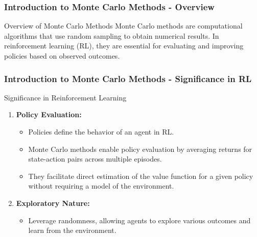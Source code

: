 \documentclass[aspectratio=169]{beamer}
\begin{document}
\frame{\titlepage}

\begin{frame}[fragile]
    \frametitle{Introduction to Monte Carlo Methods - Overview}
    \begin{block}{Overview of Monte Carlo Methods}
        Monte Carlo methods are computational algorithms that use random sampling to obtain numerical results. 
        In reinforcement learning (RL), they are essential for evaluating and improving policies based on observed outcomes.
    \end{block}
\end{frame}

\begin{frame}[fragile]
    \frametitle{Introduction to Monte Carlo Methods - Significance in RL}
    \begin{block}{Significance in Reinforcement Learning}
        \begin{enumerate}
            \item \textbf{Policy Evaluation:} 
            \begin{itemize}
                \item Policies define the behavior of an agent in RL.
                \item Monte Carlo methods enable policy evaluation by averaging returns for state-action pairs across multiple episodes.
                \item They facilitate direct estimation of the value function for a given policy without requiring a model of the environment.
            \end{itemize}

            \item \textbf{Exploratory Nature:}
            \begin{itemize}
                \item Leverage randomness, allowing agents to explore various outcomes and learn from the environment.
            \end{itemize}
        \end{enumerate}
    \end{block}
\end{frame}
\end{document}
